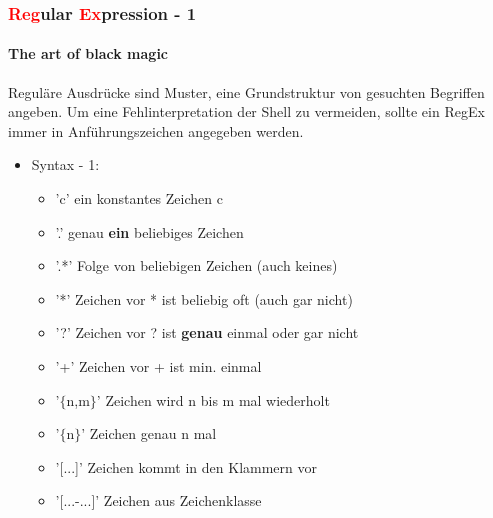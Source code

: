 \documentclass[12pt,utf8]{beamer}
\begin{document}
\begin{frame}
\frametitle{\textcolor{red}{Reg}ular \textcolor{red}{Ex}pression - 1}
\framesubtitle{The art of black magic}
Reguläre Ausdrücke sind Muster, eine Grundstruktur von gesuchten Begriffen angeben. Um eine Fehlinterpretation der Shell zu vermeiden, sollte ein RegEx immer in Anführungszeichen angegeben werden.
\begin{itemize}
	\item Syntax - 1:
	\begin{itemize}[<+->]
		\item 'c' ein konstantes Zeichen c
		\item '.' genau \textbf{ein} beliebiges Zeichen
		\item '.*' Folge von beliebigen Zeichen (auch keines)
		\item '*' Zeichen vor * ist beliebig oft (auch gar nicht)
		\item '?' Zeichen vor ? ist \textbf{genau} einmal oder gar nicht
		\item '+' Zeichen vor + ist min. einmal
		\item '$\{$n,m$\}$' Zeichen wird n bis m mal wiederholt
		\item '$\{$n$\}$' Zeichen genau n mal
		\item '[...]' Zeichen kommt in den Klammern vor
		\item '[...-...]' Zeichen aus Zeichenklasse
		
	\end{itemize}
\end{itemize}
\end{frame}
\end{document}
